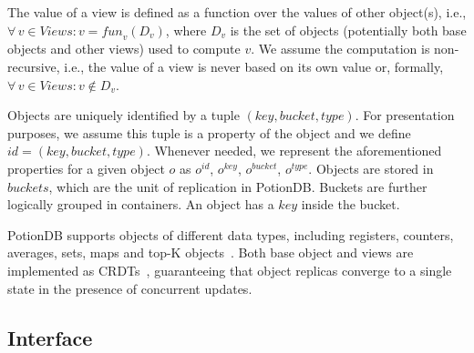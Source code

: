 \documentclass[sigplan,review,anonymous]{acmart}
\begin{document}
The value of a view is defined as a function over the values of other object(s), i.e., 
$\forall\, v \in \mathit{Views} : v = \mathit{fun}_v(D_v)$, 
where $D_v$ is the set of objects (potentially both base objects and other views) used to compute $v$.
We assume the computation is non-recursive, i.e., the value of a view is never based on its own value or, formally, 
$\forall\, v \in \mathit{Views} : v \notin D_v$.

Objects are uniquely identified by a tuple $\mathit{(key, bucket, type)}$.
For presentation purposes, we assume this tuple is a property of the object and we define $\mathit{id} = \mathit{(key, bucket, type)}$.
Whenever needed, we represent the aforementioned properties for a given object $o$ as
$o^{\mathit{id}}$, $o^{\mathit{key}}$, $o^{\mathit{bucket}}$, $o^{\mathit{type}}$.
Objects are stored in $\mathit{buckets}$, which are the unit of replication in PotionDB. 
Buckets are further logically grouped in containers. %
An object has a $\mathit{key}$ inside the bucket.

PotionDB supports objects of different data types, including registers, counters, averages, sets, maps
and top-K objects~\cite{Cabrita17Nonuniform}.
Both base object and views are implemented as CRDTs~\cite{crdt}, guaranteeing that object replicas converge to a single state
in the presence of concurrent updates.

\subsection{Interface}
\label{subsec:interface}
\end{document}
